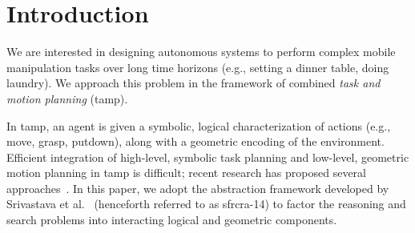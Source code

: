 \section{Introduction}
We are interested in designing autonomous systems to perform complex
mobile manipulation tasks over long time horizons (e.g., setting a
dinner table, doing laundry). We approach this problem in the
framework of combined \emph{task and motion planning} ({\sc tamp}).

In {\sc tamp}, an agent is given a symbolic, logical characterization
of actions (e.g., move, grasp, putdown), along with a geometric
encoding of the environment.  Efficient integration of high-level,
symbolic task planning and low-level, geometric motion planning in {\sc tamp} is
difficult; recent research has proposed several
approaches~\cite{srivastava2014combined, deardenplanningtamp,
  kaelbling2011hierarchical, lagriffoul2014orientation, GarrettWAFR14,
  dornhege2012semantic}.  In this paper, we adopt the abstraction
framework developed by Srivastava et al.~\cite{srivastava2014combined}
(henceforth referred to as {\sc sfrcra-14}) to factor the reasoning
and search problems into interacting logical and geometric components.


